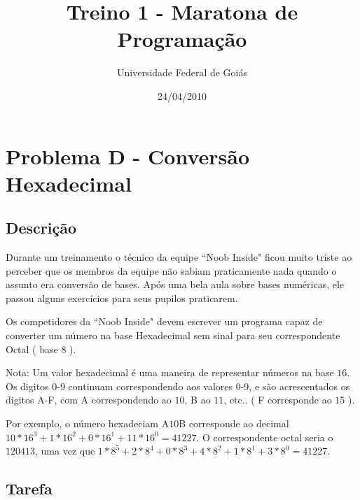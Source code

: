 \documentclass[14pt]{article}
\title{Treino 1 - Maratona de Programa\c{c}\~ao }
\author{Universidade Federal de Goi\'as}
\date{24/04/2010}                                           %
\begin{document}
\maketitle




\section{Problema D - Convers\~ao Hexadecimal}

\subsection{Descri\c{c}\~ao}

Durante um treinamento o t\'ecnico da equipe ``Noob Inside" ficou muito triste ao perceber que os membros da equipe n\~ao sabiam praticamente nada quando o assunto era convers\~ao de bases. Ap\'os uma bela aula sobre bases num\'ericas, ele passou alguns exerc\'icios para seus pupilos praticarem.

Os competidores da ``Noob Inside" devem escrever um programa capaz de converter um n\'umero na base Hexadecimal sem sinal para seu correspondente Octal ( base 8 ).

Nota: Um valor hexadecimal \'e uma maneira de representar n\'umeros na base $16$. Os digitos 0-9 continuam correspondendo aos valores 0-9, e s\~ao acrescentados os digitos A-F, com A correspondendo ao $10$, B ao $11$, etc.. ( F corresponde ao $15$ ).

Por exemplo, o n\'umero hexadeciam A$10$B corresponde ao decimal $ 10*16^3 + 1*16^2 + 0*16^1 + 11*16^0 = 41227$. O correspondente octal seria o  $120413$,  uma vez que $ 1*8^5 + 2*8^4 + 0*8^3 + 4*8^2 + 1*8^1 + 3*8^0 = 41227 $.

\subsection{Tarefa}
\end{document}
